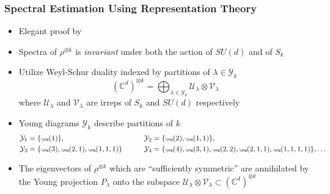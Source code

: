 \documentclass[
    9pt,
    hyperref={bookmarks=false, colorlinks=false}, %
    xcolor={dvipsnames},
]{beamer}
\begin{document}
\begin{frame}
    \frametitle{Spectral Estimation Using Representation Theory}
    \begin{itemize}
        \item Elegant proof by \citeauthor{christandl2006spectra}~
        \item Spectra of $\rho^{\otimes k}$ is \textit{invariant} under both the action of $SU(d)$ and of $S_k$
        \item Utilize Weyl-Schur duality indexed by partitions of $\lambda \in \mathcal Y_k$
            \[ (\mathbb C^{d})^{\otimes k} = \bigoplus_{\lambda \in \mathcal Y_k} \mathcal U_{\lambda} \otimes \mathcal V_{\lambda} \]
        where $\mathcal U_{\lambda}$ and $\mathcal V_{\lambda}$ are irreps of $S_k$ and $SU(d)$ respectively
        \item Young diagrams $\mathcal Y_k$ describe partitions of $k$
            \begin{alignat*}{2}
                &\mathcal Y_1 = {\tiny\{ \yng(1) \}},
                &&\qquad\mathcal Y_2 = {\tiny\{ \yng(2),\yng(1,1) \}}, \\
                &\mathcal Y_3 = {\tiny\{ \yng(3),\yng(2,1),\yng(1,1,1) \}}
                &&\qquad\mathcal Y_4 = {\tiny\{ \yng(4),\yng(3,1),\yng(2,2),\yng(2,1,1),\yng(1,1,1,1) \}}, \ldots
            \end{alignat*}
        \item The eigenvectors of $\rho^{\otimes k}$ which are ``sufficiently symmetric'' are annihilated by the Young projection $P_{\lambda}$ onto the subspace $\mathcal U_\lambda \otimes \mathcal V_\lambda \subset (\mathbb C^d)^{\otimes k}$ 
    \end{itemize}
\end{frame}
\end{document}
